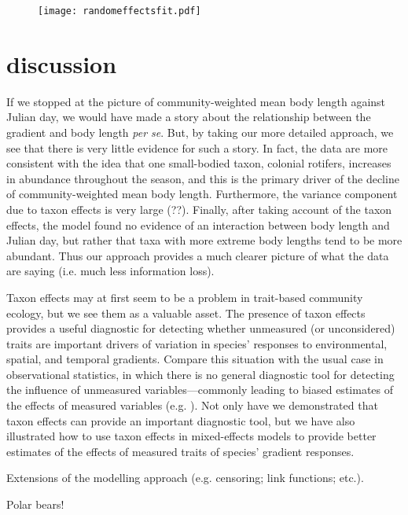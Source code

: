 \documentclass[12pt]{ecology}
\begin{document}
\begin{figure}
\texttt{[image: randomeffectsfit.pdf]}
\caption{}
\label{fig:randomeffectsfit}
\end{figure}


\section{discussion}

If we stopped at the picture of community-weighted mean body length against Julian day, we would have made a story about the relationship between the gradient and body length \emph{per se}.  But, by taking our more detailed approach, we see that there is very little evidence for such a story.  In fact, the data are more consistent with the idea that one small-bodied taxon, colonial rotifers, increases in abundance throughout the season, and this is the primary driver of the decline of community-weighted mean body length.  Furthermore, the variance component due to taxon effects is very large (??).  Finally, after taking account of the taxon effects, the model found no evidence of an interaction between body length and Julian day, but rather that taxa with more extreme body lengths tend to be more abundant.  Thus our approach provides a much clearer picture of what the data are saying (i.e. much less information loss).

Taxon effects may at first seem to be a problem in trait-based community ecology, but we see them as a valuable asset.  The presence of taxon effects provides a useful diagnostic for detecting whether unmeasured (or unconsidered) traits are important drivers of variation in species' responses to environmental, spatial, and temporal gradients.  Compare this situation with the usual case in observational statistics, in which there is no general diagnostic tool for detecting the influence of unmeasured variables---commonly leading to biased estimates of the effects of measured variables (e.g. ).  Not only have we demonstrated that taxon effects can provide an important diagnostic tool, but we have also illustrated how to use taxon effects in mixed-effects models to provide better estimates of the effects of measured traits of species' gradient responses.

Extensions of the modelling approach (e.g. censoring; link functions; etc.).


Polar bears!




\end{document}
